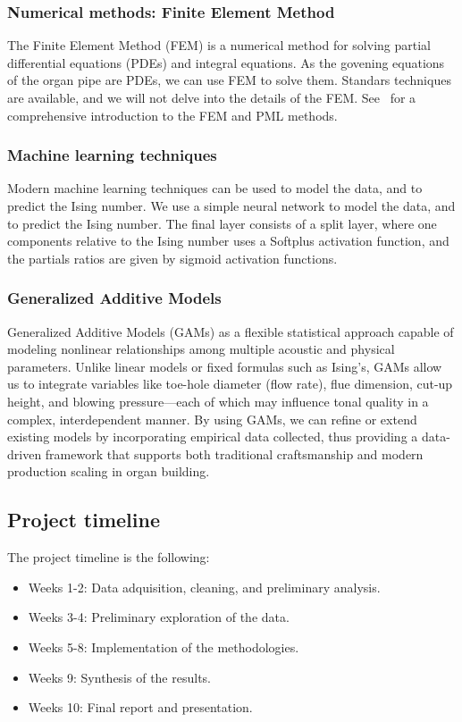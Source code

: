 \documentclass{psu-plan}
\begin{document}
\subsubsection{Numerical methods: Finite Element Method}

The Finite Element Method (FEM) is a numerical method for solving partial
differential equations (PDEs) and integral equations.
As the govening equations of the organ pipe are PDEs, we can use FEM to solve
them.
Standars techniques are available, and we will not delve into the details of the
FEM.
See~\autocite{2021ErnGue-1, 2021ErnGue-2, 2019VazKeeDem-1} for a
comprehensive introduction to the FEM and PML methods.

\subsubsection{Machine learning techniques}

Modern machine learning techniques can be used to model the data, and to
predict the Ising number.
We use a simple neural network to model the data, and to predict the Ising
number.
The final layer consists of a split layer, where one components relative to the
Ising number uses a Softplus activation function, and the
partials ratios are given by sigmoid activation functions.

\subsubsection{Generalized Additive Models}

Generalized Additive Models (GAMs) as a flexible statistical approach capable
of modeling nonlinear relationships among multiple acoustic and physical
parameters.
Unlike linear models or fixed formulas such as Ising’s, GAMs allow us to
integrate variables like toe-hole diameter (flow rate),
flue dimension, cut-up height, and blowing pressure—each of which may influence
tonal quality in a complex, interdependent manner.
By using GAMs, we can refine or extend existing models by incorporating
empirical data collected, thus providing a data-driven framework that supports
both traditional craftsmanship and modern production scaling in organ building.

\subsection{Project timeline}

The project timeline is the following:
\begin{itemize}
    \item Weeks 1-2: Data adquisition, cleaning, and preliminary analysis.
    \item Weeks 3-4: Preliminary exploration of the data.
    \item Weeks 5-8: Implementation of the methodologies.
    \item Weeks 9: Synthesis of the results.
    \item Weeks 10: Final report and presentation.
\end{itemize}

\nocite{*} %
\printbibliography[heading=bibintoc,title=Bibliography]
\end{document}
